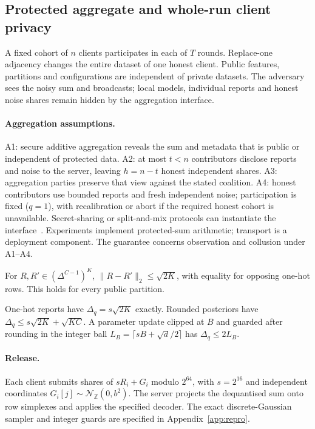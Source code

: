 \subsection{Protected aggregate and whole-run client privacy}
\label{sec:threat}
\label{sec:threat:setting}

A fixed cohort of $n$ clients participates in each of $T$ rounds. Replace-one
adjacency changes the entire dataset of one honest client. Public features,
partitions and configurations are independent of private datasets. The
adversary sees the noisy sum and broadcasts; local models, individual reports
and honest noise shares remain hidden by the aggregation interface.

\paragraph{Aggregation assumptions.}
A1: secure additive aggregation reveals the sum and metadata that is public or
independent of protected data. A2: at most $t<n$ contributors disclose reports
and noise to the server, leaving $h=n-t$ honest independent shares.
A3: aggregation parties preserve that view against the stated coalition.
A4: honest contributors use bounded reports and fresh independent noise;
participation is fixed ($q=1$), with recalibration or abort if the required
honest cohort is unavailable. Secret-sharing or split-and-mix protocols can
instantiate the interface~\cite{bonawitz2017practical,corriganGibbs2017prio,ishai2006cryptography}.
Experiments implement protected-sum arithmetic; transport is a deployment
component. The guarantee concerns observation and collusion under A1--A4.

\begin{lemma}
\label{lem:sens}
For $R,R'\in(\Delta^{C-1})^K$, $\|R-R'\|_2\le\sqrt{2K}$,
with equality for opposing one-hot rows. This holds for every public partition.
\end{lemma}

\begin{lemma}
\label{lem:sens-int}
One-hot reports have $\Delta_q=s\sqrt{2K}$ exactly.
Rounded posteriors have $\Delta_q\le s\sqrt{2K}+\sqrt{KC}$.
A parameter update clipped at $B$ and guarded after rounding in the integer
ball $L_B=\lceil sB+\sqrt d/2\rceil$ has $\Delta_q\le2L_B$.
\end{lemma}

\paragraph{Release.}
Each client submits shares of $sR_i+G_i$ modulo $2^{64}$, with
$s=2^{16}$ and independent coordinates
$G_i[j]\sim\mathcal N_{\mathbb Z}(0,b^2)$.
The server projects the dequantised sum onto row simplexes and applies the
specified decoder. The exact discrete-Gaussian sampler and integer guards
are specified in Appendix~\ref{app:repro}.

